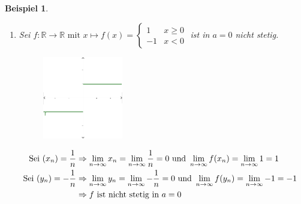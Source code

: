 \documentclass[a4paper,titlepage,oneside]{article}
\def\R{\ensuremath{\mathbb{R}} }
\renewcommand{\liminf}[2][n]{\ensuremath{\lim\limits_{#1 \rightarrow \infty}{#2}}}
\theoremstyle{thmstyle}
\newtheorem{bsp}[satz]{Beispiel}
\theoremstyle{subthmstyle}
\begin{document}
\begin{bsp}
\begin{enumerate}
\item Sei $f : \R \to \R \text{ mit } x \mapsto f(x) = \begin{cases} 1 & x \ge 0 \\
 -1 & x < 0\end{cases}$ ist in $a = 0$ nicht stetig.\\
\begin{figure}[ht]\centering
 \includegraphics[width=0.33\textwidth]{images/nichtstetig_1-1.png}
\end{figure}
\begin{math}\displaystyle \vphantom{\frac{1}{n}}\begin{aligned}[t]
\text{Sei } (x_n) = \frac{1}{n} &\Rightarrow \liminf{x_n} = \liminf{\frac{1}{n}} = 0 \text{ und } \liminf{f(x_n)} = \liminf{1} = 1 \\
\text{ Sei } (y_n) = -\frac{1}{n} &\Rightarrow \liminf{y_n} = \liminf{-\frac{1}{n}} = 0 \text{ und } \liminf{f(y_n)} = \liminf{-1} = -1 \\
&\Rightarrow f \text{ ist nicht stetig in } a = 0
\end{aligned}\end{math} 


\end{enumerate}
\end{bsp}
\end{document}
